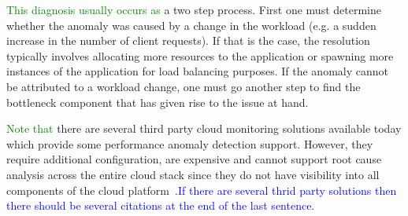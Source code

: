 \textcolor{green}{This diagnosis usually occurs as} a two step process. First one must determine
whether the anomaly was caused by a change in the workload (e.g. a sudden 
increase in the number of client requests). If that is the case,
the resolution typically involves allocating more resources to the application or spawning
more instances of the application for load balancing purposes. If the anomaly cannot be 
attributed to a workload change, one must go another step to find the bottleneck component
that has given rise to the issue at hand.


\textcolor{green}{Note that} there are several
third party cloud monitoring solutions available today which provide some performance
anomaly detection support. However, they require additional configuration, are expensive
and cannot support root cause analysis across the entire cloud stack since they do not
have visibility into all components of the cloud
platform~\cite{XXX}.\textcolor{blue}{If there are several thrid party solutions
then there should be several citations at the end of the last sentence.}
